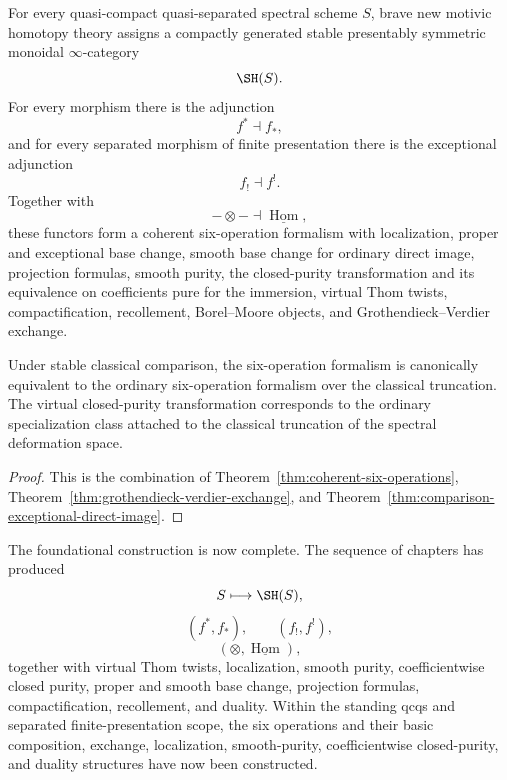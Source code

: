 \begin{theorem}
\label{thm:completed-foundational-construction}
For every quasi-compact quasi-separated spectral scheme \(S\), brave new
motivic homotopy theory assigns a compactly generated stable presentably
symmetric monoidal \(\infty\)-category
\[
    \SH(S).
\]
For every morphism there is the adjunction
\[
    f^*\dashv f_*,
\]
and for every separated morphism of finite presentation there is the
exceptional adjunction
\[
    f_!\dashv f^!.
\]
Together with
\[
    -\otimes-
    \dashv
    \underline{\operatorname{Hom}},
\]
these functors form a coherent six-operation formalism with localization,
proper and exceptional base change, smooth base change for ordinary direct
image, projection formulas, smooth purity, the closed-purity
transformation and its equivalence on coefficients pure for the immersion,
virtual Thom twists, compactification, recollement, Borel--Moore objects,
and Grothendieck--Verdier exchange.

Under stable classical comparison, the six-operation formalism is canonically
equivalent to the ordinary six-operation formalism over the classical
truncation.  The virtual closed-purity transformation corresponds to the
ordinary specialization class attached to the classical truncation of the
spectral deformation space.
\end{theorem}

\begin{proof}
This is the combination of
Theorem~\ref{thm:coherent-six-operations},
Theorem~\ref{thm:grothendieck-verdier-exchange}, and
Theorem~\ref{thm:comparison-exceptional-direct-image}.
\end{proof}

The foundational construction is now complete.  The sequence of chapters
has produced
\[
    S\longmapsto\SH(S),
\]
\[
    (f^*,f_*),
    \qquad
    (f_!,f^!),
\]
\[
    (\otimes,\underline{\operatorname{Hom}}),
\]
together with virtual Thom twists, localization, smooth purity,
coefficientwise closed purity, proper and smooth base change, projection
formulas, compactification, recollement, and duality.  Within the standing
qcqs and separated finite-presentation scope, the six operations and their
basic composition, exchange, localization, smooth-purity, coefficientwise
closed-purity, and duality structures have now been constructed.
    